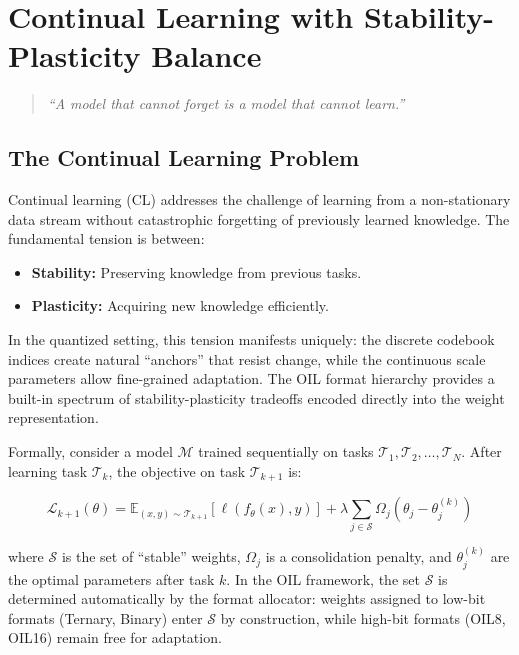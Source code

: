 
\chapter{Continual Learning with Stability-Plasticity Balance}
\label{ch:continual_learning}

\begin{quote}
\textit{``A model that cannot forget is a model that cannot learn.''}
\end{quote}

\section{The Continual Learning Problem}
\label{sec:continual_learning_intro}

Continual learning (CL) addresses the challenge of learning from a non-stationary data stream without catastrophic forgetting of previously learned knowledge. The fundamental tension is between:

\begin{itemize}
    \item \textbf{Stability:} Preserving knowledge from previous tasks.
    \item \textbf{Plasticity:} Acquiring new knowledge efficiently.
\end{itemize}

In the quantized setting, this tension manifests uniquely: the discrete codebook indices create natural ``anchors'' that resist change, while the continuous scale parameters allow fine-grained adaptation. The OIL format hierarchy provides a built-in spectrum of stability-plasticity tradeoffs encoded directly into the weight representation.

Formally, consider a model $\mathcal{M}$ trained sequentially on tasks $\mathcal{T}_1, \mathcal{T}_2, \ldots, \mathcal{T}_N$. After learning task $\mathcal{T}_k$, the objective on task $\mathcal{T}_{k+1}$ is:

$$\mathcal{L}_{k+1}(\theta) = \mathbb{E}_{(x,y) \sim \mathcal{T}_{k+1}} \left[ \ell(f_\theta(x), y) \right] + \lambda \sum_{j \in \mathcal{S}} \Omega_j(\theta_j - \theta_j^{(k)})$$

where $\mathcal{S}$ is the set of ``stable'' weights, $\Omega_j$ is a consolidation penalty, and $\theta_j^{(k)}$ are the optimal parameters after task $k$. In the OIL framework, the set $\mathcal{S}$ is determined automatically by the format allocator: weights assigned to low-bit formats (Ternary, Binary) enter $\mathcal{S}$ by construction, while high-bit formats (OIL8, OIL16) remain free for adaptation.

